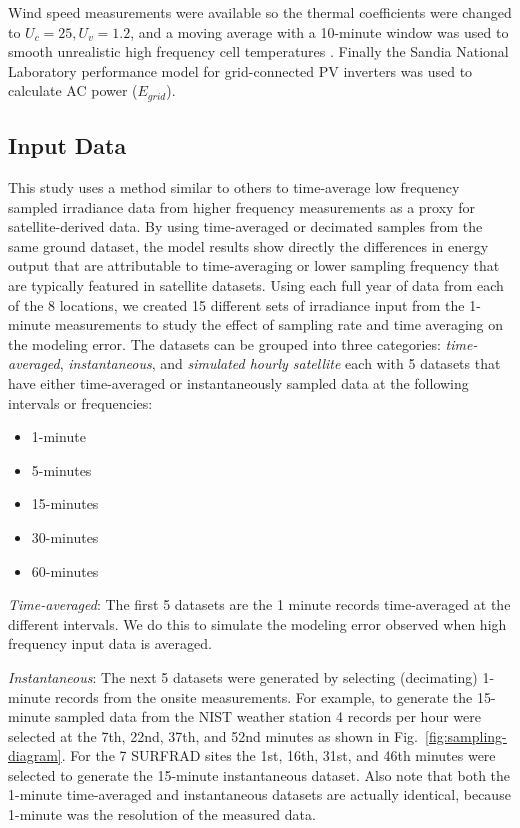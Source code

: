 \documentclass[conference]{IEEEtran}
\begin{document}
Wind speed measurements were available so the thermal coefficients were changed to $U_c=25, U_v=1.2$, and a moving average with a 10-minute window was used to smooth unrealistic high frequency cell temperatures \cite{9095219}. Finally the Sandia National Laboratory performance model for grid-connected PV inverters \cite{King2007} was used to calculate AC power ($E_{grid}$).

\subsection{Input Data}
This study uses a method similar to others to time-average low frequency sampled irradiance data from higher frequency measurements \cite{Bowersox2021,osti_1797569} as a proxy for satellite-derived data. By using time-averaged or decimated samples from the same ground dataset, the model results show directly the differences in energy output that are attributable to time-averaging or lower sampling frequency that are typically featured in satellite datasets. Using each full year of data from each of the 8 locations, we created 15 different sets of irradiance input from the 1-minute measurements to study the effect of sampling rate and time averaging on the modeling error. The datasets can be grouped into three categories: \emph{time-averaged}, \emph{instantaneous}, and \emph{simulated hourly satellite} each with 5 datasets that have either time-averaged or instantaneously sampled data at the following intervals or frequencies:

\begin{itemize}
    \item 1-minute
    \item 5-minutes
    \item 15-minutes
    \item 30-minutes
    \item 60-minutes
\end{itemize}

\emph{Time-averaged}: The first 5 datasets are the 1 minute records time-averaged at the different intervals. We do this to simulate the modeling error observed when high frequency input data is averaged.

\emph{Instantaneous}: The next 5 datasets were generated by selecting (decimating) 1-minute records from the onsite measurements. For example, to generate the 15-minute sampled data from the NIST weather station 4 records per hour were selected at the 7th, 22nd, 37th, and 52nd minutes as shown in Fig.~\ref{fig:sampling-diagram}. For the 7 SURFRAD sites the 1st, 16th, 31st, and 46th minutes were selected to generate the 15-minute instantaneous dataset. Also note that both the 1-minute time-averaged and instantaneous datasets are actually identical, because 1-minute was the resolution of the measured data.
\end{document}
